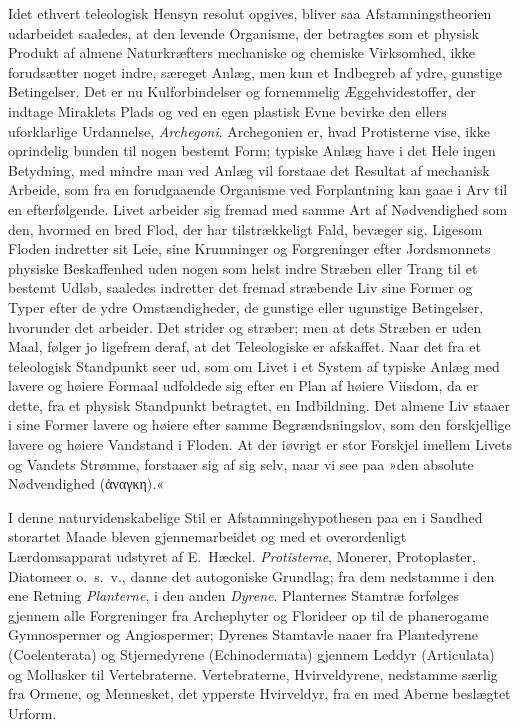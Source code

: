 \documentclass[12pt]{book}
\newcommand{\apage}[1]{\marginnote{\footnotesize\textit{[#1]}}}
\begin{document}
Idet ethvert teleologisk Hensyn resolut opgives, bliver saa
Afstamningstheorien udarbeidet saaledes, at den levende Organisme, der
betragtes som et physisk Produkt af almene Naturkræfters mechaniske og
chemiske Virksomhed, ikke forudsætter noget indre, særeget Anlæg, men kun
et Indbegreb af ydre, gunstige Betingelser. Det er nu Kulforbindelser og
fornemmelig Æggehvidestoffer, der indtage Miraklets Plads og ved en egen
plastisk Evne bevirke den ellers uforklarlige Urdannelse, \emph{Archegoni}.
Archegonien er, hvad  \apage{197} Protisterne vise, ikke oprindelig bunden til nogen
bestemt Form; typiske Anlæg have i det Hele ingen Betydning, med mindre man
ved Anlæg vil forstaae det Resultat af mechanisk Arbeide, som fra en
forudgaaende Organisme ved Forplantning kan gaae i Arv til en efterfølgende.
Livet arbeider sig fremad med samme Art af Nødvendighed som den, hvormed en
bred Flod, der har tilstrækkeligt Fald, bevæger sig. Ligesom Floden
indretter sit Leie, sine Krumninger og Forgreninger efter Jordsmonnets
physiske Beskaffenhed uden nogen som helst indre Stræben eller Trang til et
bestemt Udløb, saaledes indretter det fremad stræbende Liv sine Former og
Typer efter de ydre Omstændigheder, de gunstige eller ugunstige
Betingelser, hvorunder det arbeider. Det strider og stræber; men at dets
Stræben er uden Maal, følger jo ligefrem deraf, at det Teleologiske er
afskaffet. Naar det fra et teleologisk Standpunkt seer ud, som om Livet i
et System af typiske Anlæg med lavere og høiere Formaal udfoldede sig efter
en Plan af høiere Viisdom, da er dette, fra et physisk Standpunkt
betragtet, en Indbildning. Det almene Liv staaer i sine Former lavere og
høiere efter samme Begrændsningslov, som den forskjellige lavere og høiere
Vandstand i Floden. At der iøvrigt er stor Forskjel imellem Livets og
Vandets Strømme, forstaaer sig af sig selv, naar vi see paa »den absolute
Nødvendighed (ἀναγκη).«

I denne naturvidenskabelige Stil er Afstamningshypothesen paa en i Sandhed
storartet Maade bleven gjennemarbeidet og med et overordenligt  \apage{198}
Lærdomsapparat udstyret af E.\ Hæckel. \emph{Protisterne}, Monerer, Protoplaster,
Diatomeer o.\ s.\ v., danne det autogoniske Grundlag; fra dem nedstamme i den
ene Retning \emph{Planterne}, i den anden \emph{Dyrene}. Planternes Stamtræ forfølges
gjennem alle Forgreninger fra Archephyter og Florideer op til de
phanerogame Gymnospermer og Angiospermer; Dyrenes Stamtavle naaer fra
Plantedyrene (Coelenterata) og Stjernedyrene
(Echinodermata) gjennem Leddyr (Articulata) og Mollusker
til Vertebraterne. Vertebraterne, Hvirveldyrene, nedstamme særlig fra
Ormene, og Mennesket, det ypperste Hvirveldyr, fra en med Aberne beslægtet
Urform.
\end{document}
